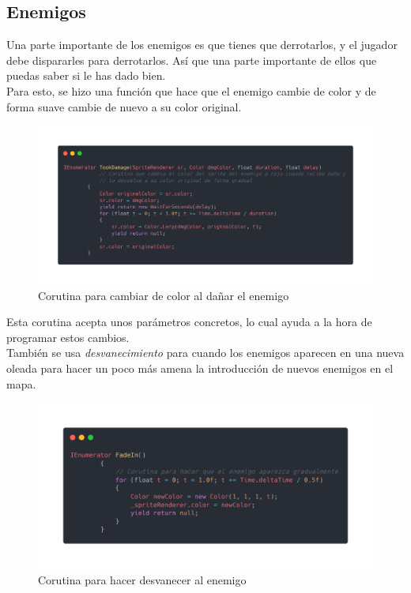 \documentclass[12pt]{article}
\begin{document}
    \subsection{Enemigos}
        Una parte importante de los enemigos es que tienes que derrotarlos, y el jugador debe dispararles para derrotarlos. Así que una parte importante de ellos que puedas saber si le has dado bien. \\
        Para esto, se hizo una función que hace que el enemigo cambie de color y de forma suave cambie de nuevo a su color original. \\
        \begin{figure}[H]
            \centering
            \includegraphics[width=\textwidth]{Images/Menuprincipal/TookDamage.png}
            \caption{Corutina para cambiar de color al dañar el enemigo}
        \end{figure}
        Esta corutina acepta unos parámetros concretos, lo cual ayuda a la hora de programar estos cambios.\\

        También se usa \textit{desvanecimiento} para cuando los enemigos aparecen en una nueva oleada para hacer un poco más amena la introducción de nuevos enemigos en el mapa.
        \begin{figure}[H]
            \centering
            \includegraphics[width=\textwidth]{Images/Menuprincipal/fadein.png}
            \caption{Corutina para hacer desvanecer al enemigo}
        \end{figure}
\end{document}
